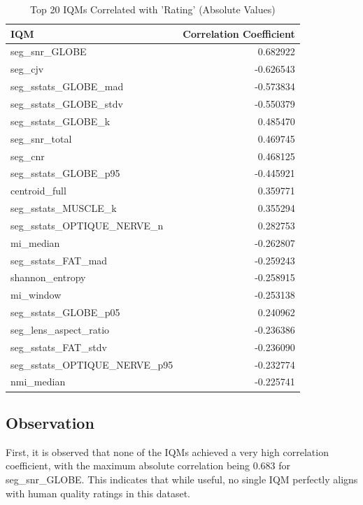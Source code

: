 \begin{table}[htbp]
    \centering
    \caption{Top 20 IQMs Correlated with 'Rating' (Absolute Values)}
    \label{tab:top_iqm_correlations}
    \begin{tabular}{lr}
        \toprule
        \textbf{IQM} & \textbf{Correlation Coefficient} \\
        \midrule
        seg\_snr\_GLOBE                   & 0.682922 \\
        seg\_cjv                        & -0.626543 \\
        seg\_sstats\_GLOBE\_mad           & -0.573834 \\
        seg\_sstats\_GLOBE\_stdv          & -0.550379 \\
        seg\_sstats\_GLOBE\_k              & 0.485470 \\
        seg\_snr\_total                   & 0.469745 \\
        seg\_cnr                         & 0.468125 \\
        seg\_sstats\_GLOBE\_p95           & -0.445921 \\
        centroid\_full                   & 0.359771 \\
        seg\_sstats\_MUSCLE\_k             & 0.355294 \\
        seg\_sstats\_OPTIQUE\_NERVE\_n      & 0.282753 \\
        mi\_median                      & -0.262807 \\
        seg\_sstats\_FAT\_mad             & -0.259243 \\
        shannon\_entropy                & -0.258915 \\
        mi\_window                      & -0.253138 \\
        seg\_sstats\_GLOBE\_p05            & 0.240962 \\
        seg\_lens\_aspect\_ratio          & -0.236386 \\
        seg\_sstats\_FAT\_stdv            & -0.236090 \\
        seg\_sstats\_OPTIQUE\_NERVE\_p95   & -0.232774 \\
        nmi\_median                     & -0.225741 \\
        \bottomrule
    \end{tabular}
\end{table}

\subsection{Observation}
First, it is observed that none of the IQMs achieved a very high correlation coefficient, with the maximum absolute correlation being 0.683 for seg\_snr\_GLOBE. This indicates that while useful, no single IQM perfectly aligns with human quality ratings in this dataset.

